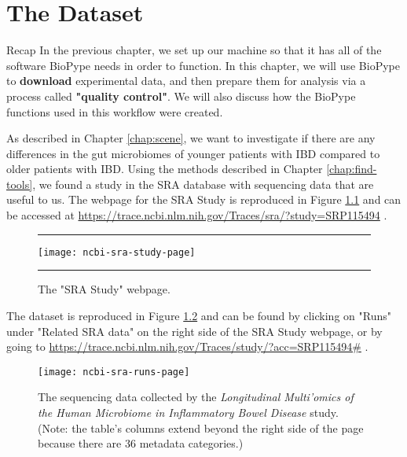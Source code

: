 \chapter{The Dataset}
    \begin{maxipage}
    \begin{bclogo}[couleur = vlightgray, logo = \bcinfo] {Recap}
    In the previous chapter, we set up our machine so that it has all of the software BioPype needs in order to function. \newline \newline In this chapter, we will use BioPype to \textbf{download} experimental data, and then prepare them for analysis via a process called \textbf{"quality control"}. We will also discuss how the BioPype functions used in this workflow were created.
    \end{bclogo}
    \end{maxipage}

As described in Chapter \ref{chap:scene}, we want to investigate if there are any differences in the gut microbiomes of younger patients with IBD compared to older patients with IBD. Using the methods described in Chapter \ref{chap:find-tools}, we found a study in the SRA database with sequencing data that are useful to us. The webpage for the SRA Study is reproduced in Figure \ref{fig:ncbi-sra-study-page} and can be accessed at
    \url{https://trace.ncbi.nlm.nih.gov/Traces/sra/?study=SRP115494} .
    
%
\begin{figure}[hbtp]
    \begin{maxipage}
    \hrule
    \centering
    \texttt{[image: ncbi-sra-study-page]}
    \caption{The "SRA Study" webpage.}
    \label{fig:ncbi-sra-study-page}
    \hrule
    \end{maxipage}
\end{figure}
%

The dataset is reproduced in Figure \ref{fig:ncbi-sra-runs-page} and can be found by clicking on "Runs" under "Related SRA data" on the right side of the SRA Study webpage, or by going to \url{https://trace.ncbi.nlm.nih.gov/Traces/study/?acc=SRP115494#} .

%
\begin{figure}[hbtp]
    \begin{maxipage}
    \centering
    \texttt{[image: ncbi-sra-runs-page]}
    \caption{The sequencing data collected by the \textit{Longitudinal Multi'omics of the Human Microbiome in Inflammatory Bowel Disease} study. (Note: the table's columns extend beyond the right side of the page because there are 36 metadata categories.)}
    \label{fig:ncbi-sra-runs-page}
    \end{maxipage}
\end{figure}
%
    
